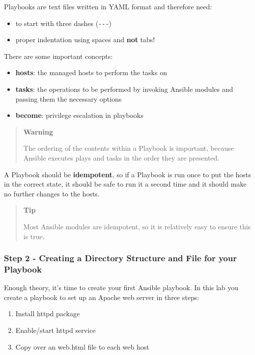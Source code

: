 Playbooks are text files written in YAML format and therefore need:

\begin{itemize}
\item
  to start with three dashes (\texttt{-\/-\/-})
\item
  proper indentation using spaces and \textbf{not} tabs!
\end{itemize}

There are some important concepts:

\begin{itemize}
\item
  \textbf{hosts}: the managed hosts to perform the tasks on
\item
  \textbf{tasks}: the operations to be performed by invoking Ansible
  modules and passing them the necessary options
\item
  \textbf{become}: privilege escalation in playbooks
\end{itemize}

\begin{quote}
\textbf{Warning}

The ordering of the contents within a Playbook is important, because
Ansible executes plays and tasks in the order they are presented.
\end{quote}

A Playbook should be \textbf{idempotent}, so if a Playbook is run once
to put the hosts in the correct state, it should be safe to run it a
second time and it should make no further changes to the hosts.

\begin{quote}
\textbf{Tip}

Most Ansible modules are idempotent, so it is relatively easy to ensure
this is true.
\end{quote}

\hypertarget{step-2---creating-a-directory-structure-and-file-for-your-playbook}{%
\subsubsection{Step 2 - Creating a Directory Structure and File for your
Playbook}\label{step-2---creating-a-directory-structure-and-file-for-your-playbook}}

Enough theory, it's time to create your first Ansible playbook. In this
lab you create a playbook to set up an Apache web server in three steps:

\begin{enumerate}
\def\labelenumi{\arabic{enumi}.}
\tightlist
\item
  Install httpd package
\item
  Enable/start httpd service
\item
  Copy over an web.html file to each web host
\end{enumerate}

